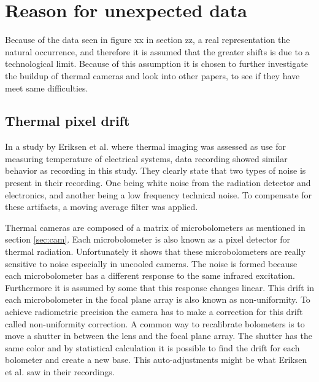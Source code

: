 \section{Reason for unexpected data}


Because of the data seen in figure xx in section zz, a real representation the natural occurrence, and therefore it is assumed that the greater shifts is due to a technological limit. Because of this assumption it is chosen to further investigate the buildup of thermal cameras and look into other papers, to see if they have meet same difficulties.

\subsection{Thermal pixel drift}

In a study by Eriksen et al. where thermal imaging was assessed as use for measuring temperature of electrical systems, data recording showed similar behavior as recording in this study. They clearly state that two types of noise is present in their recording. One being white noise from the radiation detector and electronics, and another being a low frequency technical noise. To compensate for these artifacts, a moving average filter was applied.\cite{eriksen2014}


Thermal cameras are composed of a matrix of microbolometers as mentioned in section \cref{sec:cam}. Each microbolometer is also known as a pixel detector for thermal radiation.\cite{olbrycht2015,wolf2016} Unfortunately it shows that these microbolometers are really sensitive to noise especially in uncooled cameras. The noise is formed because each microbolometer has a different response to the same infrared excitation. Furthermore it is assumed by some that this response changes linear\cite{olbrycht2015}. This drift in each microbolometer in the focal plane array is also known as non-uniformity. To achieve radiometric precision the camera has to make a correction for this drift called non-uniformity correction. A common way to recalibrate bolometers is to move a shutter in between the lens and the focal plane array. The shutter has the same color and by statistical calculation it is possible to find the drift for each bolometer and create a new base.\cite{olbrycht2015,wolf2016} This auto-adjustments might be what Eriksen et al. saw in their recordings. 




